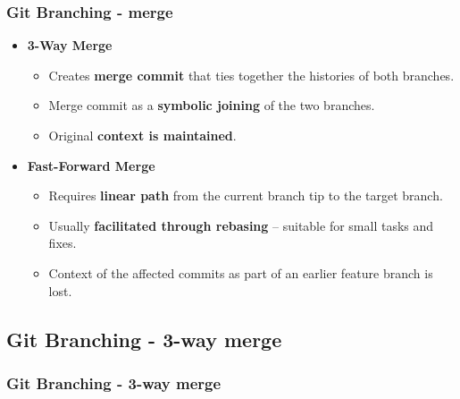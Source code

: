 \begin{frame}
\frametitle{Git Branching - merge}
\begin{itemize}
	\item \textbf{3-Way Merge}
		\begin{itemize}
		\item Creates \textbf{merge commit} that ties together the histories of both branches.
		\item Merge commit as a \textbf{symbolic joining} of the two branches.
		\item Original \textbf{context is maintained}.
		\end{itemize}
	\item \textbf{Fast-Forward Merge}
		\begin{itemize}
		\item Requires \textbf{linear path} from the current branch tip to the target branch.
		\item Usually \textbf{facilitated through rebasing} – suitable for small tasks and fixes.
		\item Context of the affected commits as part of an earlier feature branch is lost.
		\end{itemize}
\end{itemize}
\end{frame}

\subsection[]{Git Branching - 3-way merge}
\begin{frame}
\frametitle{Git Branching - 3-way merge}
\end{frame}


